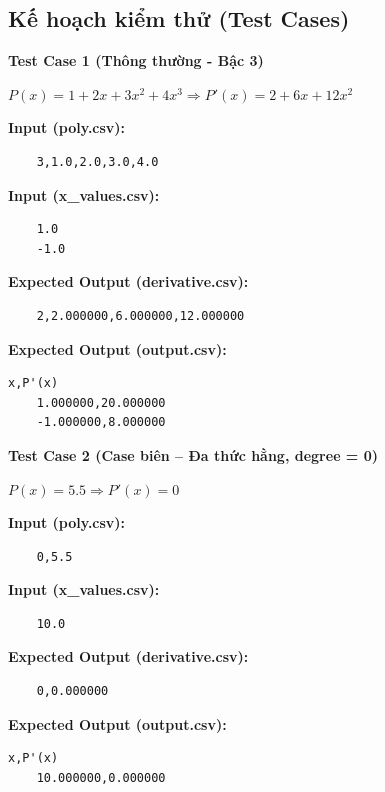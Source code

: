 \subsection{Kế hoạch kiểm thử (Test Cases)}

    \textbf{Test Case 1 (Thông thường - Bậc 3)}
    
    $P(x) = 1 + 2x + 3x^2 + 4x^3 \Rightarrow P'(x) = 2 + 6x + 12x^2$
    
    \textbf{Input (poly.csv):}
    \begin{lstlisting}
    3,1.0,2.0,3.0,4.0\end{lstlisting}
    \textbf{Input (x\_values.csv):}
    \begin{lstlisting}
    1.0
    -1.0\end{lstlisting}
    
    \textbf{Expected Output (derivative.csv):}
    \begin{lstlisting}
    2,2.000000,6.000000,12.000000\end{lstlisting}
    \textbf{Expected Output (output.csv):}
    \begin{lstlisting}[language={}]
    x,P'(x)
    1.000000,20.000000
    -1.000000,8.000000\end{lstlisting}

    \vspace{0.5cm}

    \textbf{Test Case 2 (Case biên -- Đa thức hằng, degree = 0)}
    
    $P(x) = 5.5 \Rightarrow P'(x) = 0$
    
    \textbf{Input (poly.csv):}
    \begin{lstlisting}
    0,5.5\end{lstlisting}
    \textbf{Input (x\_values.csv):}
    \begin{lstlisting}
    10.0\end{lstlisting}
    
    \textbf{Expected Output (derivative.csv):}
    \begin{lstlisting}
    0,0.000000\end{lstlisting}
    \textbf{Expected Output (output.csv):}
    \begin{lstlisting}[language={}]
    x,P'(x)
    10.000000,0.000000\end{lstlisting} 
